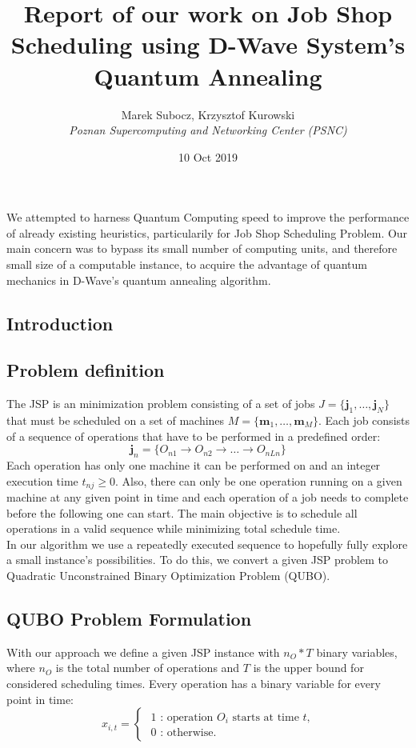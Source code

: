 \documentclass[letterpaper, 11pt]{article}
\title{Report of our work on Job Shop Scheduling using D-Wave System's Quantum Annealing}
\author{
Marek Subocz, Krzysztof Kurowski \\
\textit{Poznan Supercomputing and Networking Center (PSNC)}
}
\date{10 Oct 2019}
\begin{document}
\maketitle
We attempted to harness Quantum Computing speed to improve the 
performance of already existing heuristics, particularily 
for Job Shop Scheduling Problem. Our main concern was to bypass
its small number of computing units, and therefore small size
of a computable instance, to acquire the advantage of quantum
mechanics in D-Wave's quantum annealing algorithm. 
\vspace{10pt}
\begin{multicols}{2}
\section{Introduction}
\label{sec:intro}
\subsection{Problem definition}
The JSP is an minimization problem consisting of a set of jobs 
$J = \{\textbf{j}_1,\dots,\textbf{j}_N\}$
that must be scheduled on a set of machines
$M = \{\textbf{m}_1, \dots, \textbf{m}_M\}$. 
Each job consists of a sequence of operations that have to be performed
in a predefined order:
\begin{equation}
\textbf{j}_n = \{O_{n1} \rightarrow O_{n2} \rightarrow \dots \rightarrow O_{nLn}\}
\end{equation}
Each operation has only one machine it can be performed on and an
integer execution time $t_{nj} \geq 0$.
Also, there can only be one operation running on a given machine at 
any given point in time and each operation of a job needs to complete 
before the following one can start. The main objective is to schedule
all operations in a valid sequence while minimizing total schedule time.
\\
In our algorithm we use a repeatedly executed sequence to hopefully
fully explore a small instance's possibilities. To do this, we convert
a given JSP problem to Quadratic Unconstrained Binary Optimization
Problem (QUBO). 

\subsection{QUBO Problem Formulation}
With our approach we define a given JSP instance with $n_O * T$
binary variables, where $n_O$ is the total number of operations and
$T$ is the upper bound for considered scheduling times. Every
operation has a binary variable for every point in time:
\begin{equation}
    x_{i,t} =
    \begin{cases}
        \text{ 1 : operation $O_i$ starts at time $t$,} \\
        \text{ 0 : otherwise.}
    \end{cases}
\end{equation}

\end{multicols}
\end{document}
